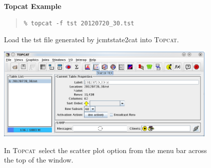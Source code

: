 \documentclass[twoside,11pt]{article}
\newcommand{\htmladdnormallink}[2]{#1}
\newenvironment{latexonly}{}{}
\renewcommand{\_}{\texttt{\symbol{95}}}
\newenvironment{fmpage}[1]{\begin{lrbox}{\fmbox}\begin{minipage}{#1}}{\end{minipage}\end{lrbox}\fbox{\usebox{\fmbox}}}
\newenvironment{myquote}{
   \color{MidnightBlue}\begin{quote}\begin{small}}{
   \end{small}\end{quote}
}
\newcommand{\topcat}{\htmladdnormallink{\textsc{Topcat}}{http://www.starlink.ac.uk/topcat}}
\newcommand{\task}[1]{\textsf{#1}}
\renewenvironment{myquote}{
      \begin{quote}\begin{small}}{
      \end{small}\end{quote}
   }
\begin{document}
\begin{latexonly}
\begin{figure}[ht!]
\begin{center}
\begin{fmpage}{0.95\linewidth}
\vspace{0.2cm}
\textbf{Topcat Example}

\vspace{0.5cm}

\begin{minipage}[c]{0.6\linewidth}

\begin{myquote}
\begin{verbatim}
% topcat -f tst 20120720_30.tst
\end{verbatim}
\end{myquote}
\end{minipage}
\hspace{0.3cm}
\begin{minipage}[c]{0.32\linewidth}
Load the tst file generated by \task{jcmtstate2cat} into \topcat.
\end{minipage}

\vspace{0.5cm}

\begin{minipage}[c]{0.6\linewidth}
\centering
\includegraphics[width=0.95\textwidth]{sc21_topcat1}

\end{minipage}
\hspace{0.3cm}
\begin{minipage}[c]{0.32\linewidth}
In \topcat\ select the scatter plot option
from the menu bar across the top of the window.
\end{minipage}

\vspace{0.5cm}


\end{fmpage}
\end{center}
\end{figure}
\end{latexonly}
\end{document}

